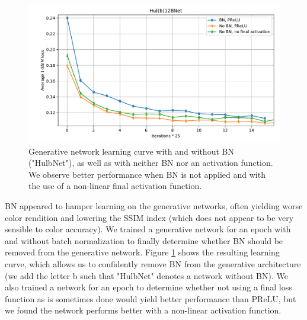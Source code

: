 \begin{figure}[!htbp]
\centering
\includegraphics[width=1\linewidth]{gfx/graphs/gen-BN.pdf}
\caption[Generative network learning curve with and without batch normalization]{Generative network learning curve with and without \acl{BN} ("HulbNet"), as well as with neither \ac{BN} nor an activation function. We observe better performance when \acl{BN} is not applied and with the use of a non-linear final activation function.}
\label{fig:gen-BN}
\end{figure}

\acl{BN} appeared to hamper learning on the generative networks, often yielding worse color rendition and lowering the \ac{SSIM} index (which does not appear to be very sensible to color accuracy). We trained a generative network for an epoch with and without batch normalization to finally determine whether \ac{BN} should be removed from the generative network. Figure \ref{fig:gen-BN} shows the resulting learning curve, which allows us to confidently remove \ac{BN} from the generative architecture (we add the letter b such that "HulbNet" denotes a network without \ac{BN}). We also trained a network for an epoch to determine whether not using a final loss function as is sometimes done \cite{dncnn} would yield better performance than \ac{PReLU}, but we found the network performs better with a non-linear activation function.

